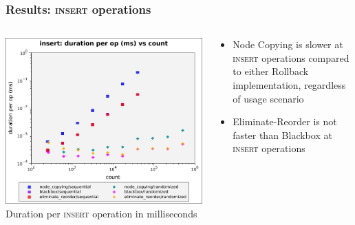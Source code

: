 \documentclass{beamer}
\begin{document}
\begin{frame}
\frametitle{Results: \textsc{insert} operations}
\begin{columns}[t]
  \begin{column}{0.55\textwidth}

      \includegraphics[height=0.65\textheight]{figures/graphs/insert-duration-per-op-vs-count.pdf}
      \newline Duration per \textsc{insert} operation in milliseconds\vphantom{ --- only head node}
  \end{column}

  \begin{column}{0.50\textwidth}
    \begin{itemize}

      \item Node Copying is slower at \textsc{insert} operations compared to either
      Rollback implementation, regardless of usage scenario

      \item Eliminate-Reorder is not faster than Blackbox at \textsc{insert}
      operations

    \end{itemize}
  \end{column}
\end{columns}
\end{frame}
\end{document}
